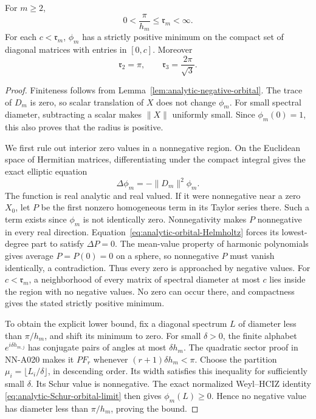 \begin{lemma}
\label{lem:analytic-orbital-radius-properties}
For $m\ge2$,
\[
                  0<\frac\pi{h_m}\le\mathfrak r_m<\infty.
\]
For each $c<\mathfrak r_m$, $\phi_m$ has a strictly positive minimum
on the compact set of diagonal matrices with entries in $[0,c]$.
Moreover
\begin{equation}\label{eq:analytic-first-orbital-radii}
                   \mathfrak r_2=\pi,\qquad
                   \mathfrak r_3=\frac{2\pi}{\sqrt3}.
\end{equation}
\end{lemma}

\begin{proof}
Finiteness follows from Lemma~\ref{lem:analytic-negative-orbital}.
The trace of $D_m$ is zero, so scalar translation of $X$ does not
change $\phi_m$. For small spectral diameter, subtracting a scalar
makes $\|X\|$ uniformly small. Since $\phi_m(0)=1$, this also proves
that the radius is positive.

We first rule out interior zero values in a nonnegative region.
On the Euclidean space of Hermitian matrices, differentiating under
the compact integral gives the exact elliptic equation
\begin{equation}\label{eq:analytic-orbital-Helmholtz}
                         \Delta\phi_m=-\|D_m\|^2\phi_m.
\end{equation}
The function is real analytic and real valued. If it were nonnegative
near a zero $X_0$, let $P$ be the first nonzero homogeneous term in
its Taylor series there. Such a term exists since $\phi_m$ is not
identically zero. Nonnegativity makes $P$ nonnegative in every real
direction. Equation~\eqref{eq:analytic-orbital-Helmholtz} forces its
lowest-degree part to satisfy $\Delta P=0$. The mean-value property
of harmonic polynomials gives average $P= P(0)=0$ on a sphere, so
nonnegative $P$ must vanish identically, a contradiction. Thus every
zero is approached by negative values. For $c<\mathfrak r_m$, a
neighborhood of every matrix of spectral diameter at most $c$ lies
inside the region with no negative values. No zero can occur there,
and compactness gives the stated strictly positive minimum.

To obtain the explicit lower bound, fix a diagonal spectrum $L$ of
diameter less than $\pi/h_m$, and shift its minimum to zero.
For small $\delta>0$, the finite alphabet
$e^{i\delta h_{m,j}}$ has conjugate pairs of angles at most
$\delta h_m$. The quadratic sector proof in NN-A020 makes it
$PF_r$ whenever $(r+1)\delta h_m<\pi$. Choose the partition
$\mu_i=\lfloor L_i/\delta\rfloor$, in descending order.
Its width satisfies this inequality for sufficiently small $\delta$.
Its Schur value is nonnegative. The exact normalized Weyl--HCIZ
identity \eqref{eq:analytic-Schur-orbital-limit} then gives
$\phi_m(L)\ge0$. Hence no negative value has diameter less than
$\pi/h_m$, proving the bound.


\end{proof}
